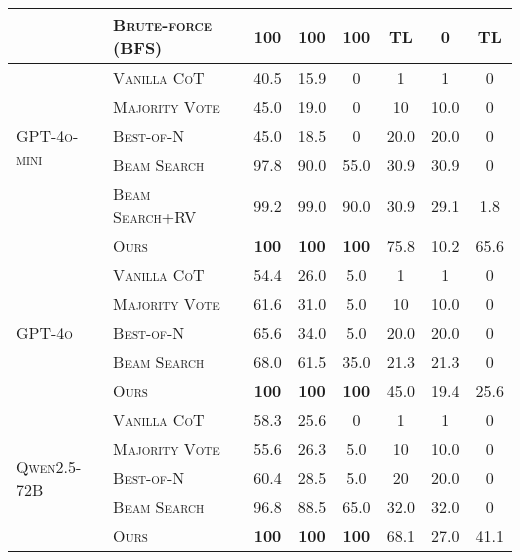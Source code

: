 \begin{table*}[t]
\begin{tabular}{ll|cccccc}
& \textsc{Brute-force (BFS)}&\num{100}&\num{100} & \bfseries\num{100} & {TL} & \num{0} & {TL} \\
\midrule
\multirow{5}{*}{\textsc{GPT-4o-mini}} & \textsc{Vanilla CoT} & \num{40.5} & \num{15.9} & \num{0} & \num{1} & \num{1} & \num{0} \\
& \textsc{Majority Vote} & \num{45.0} & \num{19.0} & \num{0} & \num{10} & \num{10.0} & \num{0} \\
& \textsc{Best-of-N} & \num{45.0} & \num{18.5} & \num{0} & \num{20.0} & \num{20.0} & \num{0} \\
& \textsc{Beam Search} & \num{97.8} & \num{90.0} & \num{55.0} & \num{30.9} & \num{30.9} & \num{0} \\
& \textsc{Beam Search+RV} & \num{99.2} & \num{99.0} & \num{90.0} & \num{30.9} & \num{29.1} & \num{1.8} \\
& \textsc{Ours} & \textbf{\num{100}} & \textbf{\num{100}} & \textbf{\num{100}} & \num{75.8} & \num{10.2} & \num{65.6} \\
\midrule
\multirow{5}{*}{\textsc{GPT-4o}} & \textsc{Vanilla CoT} & \num{54.4} & \num{26.0} & \num{5.0} & \num{1} & \num{1} & \num{0} \\
& \textsc{Majority Vote} & \num{61.6} & \num{31.0} & \num{5.0} & \num{10} & \num{10.0} & \num{0} \\
& \textsc{Best-of-N} & \num{65.6} & \num{34.0} & \num{5.0} & \num{20.0} & \num{20.0} & \num{0} \\
& \textsc{Beam Search} & \num{68.0} & \num{61.5} & \num{35.0} & \num{21.3} & \num{21.3} & \num{0} \\
& \textsc{Ours} & \textbf{\num{100}} & \textbf{\num{100}} & \textbf{\num{100}} & \num{45.0} & \num{19.4} & \num{25.6} \\
\midrule
\multirow{5}{*}{\textsc{Qwen2.5-72B}} & \textsc{Vanilla CoT} & \num{58.3} & \num{25.6} & \num{0} & \num{1} & \num{1} & \num{0} \\
& \textsc{Majority Vote} & \num{55.6} & \num{26.3} & \num{5.0} & \num{10} & \num{10.0} & \num{0} \\
& \textsc{Best-of-N} & \num{60.4} & \num{28.5} & \num{5.0} & \num{20} & \num{20.0} & \num{0} \\
& \textsc{Beam Search} & \num{96.8} & \num{88.5} & \num{65.0} & \num{32.0} & \num{32.0} & 0 \\
& \textsc{Ours} & \textbf{\num{100}} & \textbf{\num{100}} & \textbf{\num{100}} & \num{68.1} & \num{27.0} & \num{41.1} \\
\bottomrule
\end{tabular}
\label{tab:appendix_full_result_crosswords}
\end{table*}


